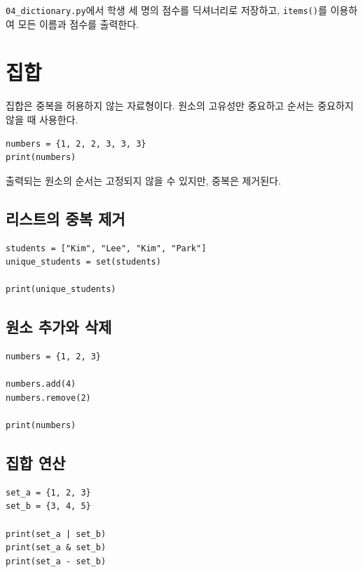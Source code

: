 \documentclass[11pt,a4paper]{article}
\begin{document}
\begin{practicebox}
\texttt{04\_dictionary.py}에서 학생 세 명의 점수를 딕셔너리로 저장하고, \texttt{items()}를 이용하여 모든 이름과 점수를 출력한다.
\end{practicebox}

\section{집합}

집합은 중복을 허용하지 않는 자료형이다. 원소의 고유성만 중요하고 순서는 중요하지 않을 때 사용한다.

\begin{lstlisting}
numbers = {1, 2, 2, 3, 3, 3}
print(numbers)
\end{lstlisting}

출력되는 원소의 순서는 고정되지 않을 수 있지만, 중복은 제거된다.

\subsection{리스트의 중복 제거}

\begin{lstlisting}
students = ["Kim", "Lee", "Kim", "Park"]
unique_students = set(students)

print(unique_students)
\end{lstlisting}

\subsection{원소 추가와 삭제}

\begin{lstlisting}
numbers = {1, 2, 3}

numbers.add(4)
numbers.remove(2)

print(numbers)
\end{lstlisting}

\subsection{집합 연산}

\begin{lstlisting}
set_a = {1, 2, 3}
set_b = {3, 4, 5}

print(set_a | set_b)
print(set_a & set_b)
print(set_a - set_b)
\end{lstlisting}
\end{document}
